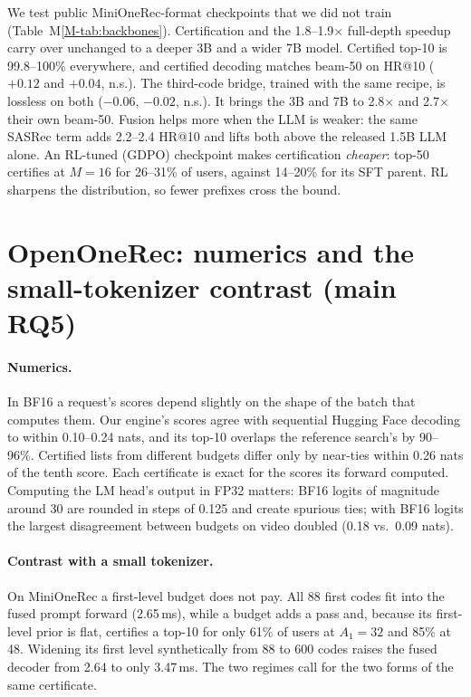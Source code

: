 \documentclass[sigconf,anonymous]{acmart}
\begin{document}
We test public MiniOneRec-format checkpoints that we did not train (Table~M\ref{M-tab:backbones}). Certification
and the 1.8--1.9$\times$ full-depth speedup carry over unchanged to a deeper 3B and a wider 7B model. Certified
top-10 is 99.8--100\% everywhere, and certified decoding matches beam-50 on HR@10 ($+0.12$ and $+0.04$, n.s.).
The third-code bridge, trained with the same recipe, is lossless on both ($-0.06$, $-0.02$, n.s.). It brings the
3B and 7B to 2.8$\times$ and 2.7$\times$ their own beam-50. Fusion helps more when the LLM is weaker: the same
SASRec term adds 2.2--2.4 HR@10 and lifts both above the released 1.5B LLM alone. An RL-tuned (GDPO) checkpoint
makes certification \emph{cheaper}: top-50 certifies at $M=16$ for 26--31\% of users, against 14--20\% for its SFT
parent. RL sharpens the distribution, so fewer prefixes cross the bound.



\section{OpenOneRec: numerics and the small-tokenizer contrast (main RQ5)}
\paragraph{Numerics.} In BF16 a request's scores depend slightly on the shape of the batch that computes them.
Our engine's scores agree with sequential Hugging Face decoding to within 0.10--0.24 nats, and its top-10 overlaps
the reference search's by 90--96\%. Certified lists from different budgets differ only by near-ties within
0.26 nats of the tenth score. Each certificate is exact for the scores its forward computed. Computing the
LM head's output in FP32 matters: BF16 logits of magnitude around 30 are rounded in steps of 0.125 and create
spurious ties; with BF16 logits the largest disagreement between budgets on video doubled (0.18 vs.\ 0.09
nats).

\paragraph{Contrast with a small tokenizer.} On MiniOneRec a first-level budget does not pay. All 88 first codes
fit into the fused prompt forward (2.65\,ms), while a budget adds a pass and, because its first-level prior is
flat, certifies a top-10 for only 61\% of users at $A_1=32$ and 85\% at 48. Widening its first level synthetically
from 88 to 600 codes raises the fused decoder from 2.64 to only 3.47\,ms. The two regimes call for the two forms of
the same certificate.
\end{document}
